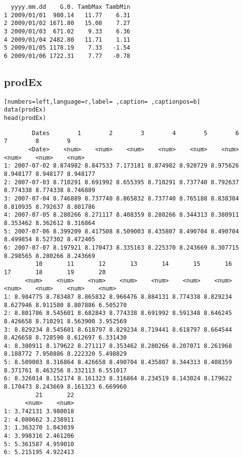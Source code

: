 \begin{verbatim}
  yyyy.mm.dd    G.0. TambMax TambMin
1 2009/01/01  980.14   11.77    6.31
2 2009/01/02 1671.80   15.08    7.27
3 2009/01/03  671.02    9.33    6.36
4 2009/01/04 2482.80   11.71    1.11
5 2009/01/05 1178.19    7.33   -1.54
6 2009/01/06 1722.31    7.77   -0.78
\end{verbatim}

\subsection{prodEx}
\label{sec:orgff793e7}
\begin{lstlisting}[numbers=left,language=r,label= ,caption= ,captionpos=b]
data(prodEx)
head(prodEx)
\end{lstlisting}

\begin{verbatim}
        Dates        1        2        3        4        5        6        7        8        9
       <Date>    <num>    <num>    <num>    <num>    <num>    <num>    <num>    <num>    <num>
1: 2007-07-02 8.874982 8.847533 7.173181 8.874982 8.920729 8.975626 8.948177 8.948177 8.948177
2: 2007-07-03 8.710291 8.691992 8.655395 8.710291 8.737740 8.792637 8.774338 8.774338 8.746889
3: 2007-07-04 8.746889 8.737740 8.865832 8.737740 8.765188 8.838384 8.810935 8.792637 8.801786
4: 2007-07-05 8.280266 8.271117 8.408359 8.280266 8.344313 8.380911 8.353462 8.362612 8.316864
5: 2007-07-06 8.399209 8.417508 8.509003 8.435807 8.490704 8.490704 8.499854 8.527302 8.472405
6: 2007-07-07 8.197921 8.170473 8.335163 8.225370 8.243669 8.307715 8.298565 8.280266 8.243669
         10       11       12       13       14       15       16       17       18       19       20
      <num>    <num>    <num>    <num>    <num>    <num>    <num>    <num>    <num>    <num>    <num>
1: 8.984775 8.783487 8.865832 8.966476 8.884131 8.774338 8.829234 8.627946 8.911580 8.807886 6.505270
2: 8.801786 8.545601 8.682843 8.774338 8.691992 8.591348 8.646245 8.426658 8.710291 8.563900 3.952569
3: 8.829234 8.545601 8.618797 8.829234 8.719441 8.618797 8.664544 8.426658 8.728590 8.612697 6.331430
4: 8.380911 8.179622 8.271117 8.353462 8.280266 8.207071 8.261968 8.188772 7.950886 8.222320 5.498829
5: 8.509003 8.316864 8.426658 8.490704 8.435807 8.344313 8.408359 8.371761 8.463256 8.332113 6.551017
6: 8.326014 8.152174 8.161323 8.316864 8.234519 8.143024 8.179622 8.170473 8.243669 8.161323 6.669960
         21       22
      <num>    <num>
1: 3.742131 3.980018
2: 4.080662 3.238911
3: 1.363270 1.043039
4: 3.998316 2.461206
5: 5.361587 4.959010
6: 5.215195 4.922413
\end{verbatim}
